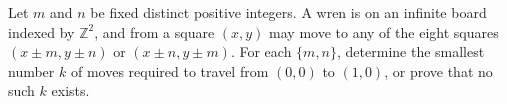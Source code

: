 Let $m$ and $n$ be fixed distinct positive integers. A wren is on an infinite board indexed by $\mathbb Z^2$, and from a square $(x,y)$ may move to any of the eight squares $(x\pm m, y\pm n)$ or $(x\pm n, y \pm m)$. For each $\{m,n\}$, determine the smallest number $k$ of moves required to travel from $(0,0)$ to $(1,0)$, or prove that no such $k$ exists.

